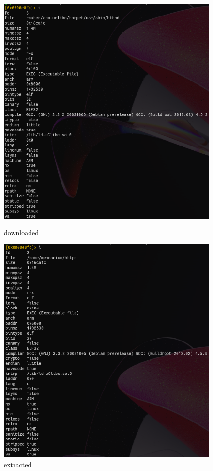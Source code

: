 \documentclass{article}
\begin{document}
	\begin{figure}[h]
		\centering
		\begin{minipage}{.5\textwidth}
			\centering
			\includegraphics[width=\linewidth]{"pictures/1.8 httpd compare downloaded"}
			\caption{downloaded}
		\end{minipage}%
		\begin{minipage}{.5\textwidth}
			\centering
			\includegraphics[width=\linewidth]{"pictures/1.8 httpd compare extracted"}
			\caption{extracted}
		\end{minipage}
	\end{figure}
	
\end{document}
